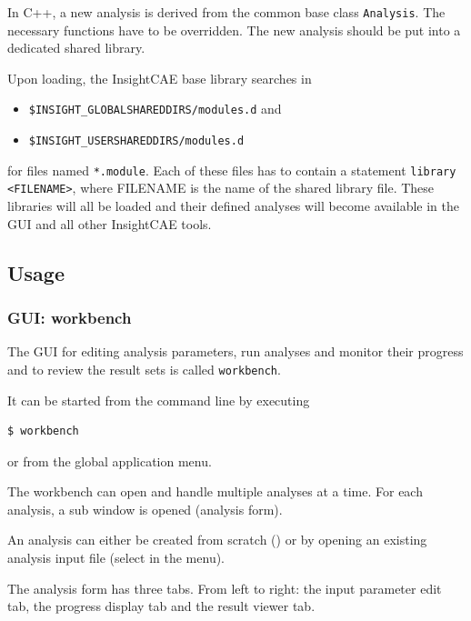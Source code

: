 In C++, a new analysis is derived from the common base class \texttt{Analysis}.
The necessary functions have to be overridden.
The new analysis should be put into a dedicated shared library.

Upon loading, the InsightCAE base library searches in 
\begin{itemize}
\item \texttt{\$INSIGHT\_GLOBALSHAREDDIRS/modules.d} and
\item \texttt{\$INSIGHT\_USERSHAREDDIRS/modules.d}
\end{itemize}
for files named \texttt{*.module}. 
Each of these files has to contain a statement \verb!library <FILENAME>!, where FILENAME is the name of the shared library file. These libraries will all be loaded and their defined analyses will become available in the GUI and all other InsightCAE tools.

\subsection{Usage}

\subsubsection{GUI: workbench}
\label{sec:workbench}

The GUI for editing analysis parameters, run analyses and monitor their progress and to review the result sets is called \texttt{workbench}.

It can be started from the command line by executing
\begin{lstlisting}[language=bash]
$ workbench
\end{lstlisting}
or from the global application menu.

The workbench can open and handle multiple analyses at a time. For each analysis, a sub window is opened (analysis form).

An analysis can either be created from scratch () or by opening an existing analysis input file (select  in the menu).

The analysis form has three tabs. From left to right: the input parameter edit tab, the progress display tab and the result viewer tab.

